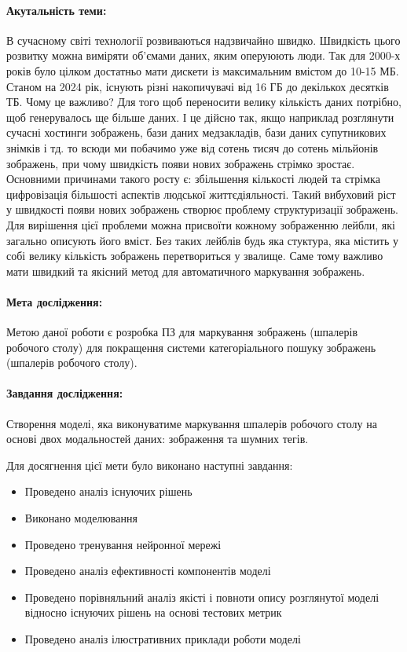 \documentclass{udstu}
\begin{document}
\paragraph{\textbf{Акутальність теми:}}
В сучасному світі технології розвиваються надзвичайно швидко. Швидкість цього розвитку можна виміряти
об'ємами даних, яким оперуюють люди. Так для 2000-х років було цілком достатньо мати дискети із максимальним вмістом
до 10-15 МБ. Станом на 2024 рік, існують різні накопичувачі від 16 ГБ до декількох десятків ТБ. Чому це важливо?
Для того щоб переносити велику кількість даних потрібно, щоб генерувалось ще більше даних. І це дійсно так, якщо
наприклад розглянути сучасні хостинги зображень, бази даних медзакладів, бази даних супутникових знімків і тд.
то всюди ми побачимо уже від сотень тисяч до сотень мільйонів зображень,
при чому швидкість появи нових зображень стрімко зростає. Основними причинами такого росту є: збільшення кількості людей
та стрімка цифровізація більшості аспектів людської життєдіяльності. Такий вибуховий ріст у швидкості
появи нових зображень створює проблему структуризації зображень. Для вирішення цієї проблеми можна присвоїти
кожному зображенню лейбли, які загально описують його вміст.
Без таких лейблів будь яка стуктура, яка містить у собі велику кількість зображень перетвориться
у звалище. Саме тому важливо мати швидкий та якісний метод для автоматичного маркування зображень.

\paragraph{\textbf{Мета дослідження:}}
Метою даної роботи є розробка ПЗ для маркування зображень (шпалерів робочого столу)
для покращення системи категоріального пошуку зображень (шпалерів робочого столу).

\paragraph{\textbf{Завдання дослідження:}}
Створення моделі, яка виконуватиме маркування шпалерів робочого столу на основі двох модальностей даних:
зображення та шумних тегів.

Для досягнення цієї мети було виконано наступні завдання:

\begin{itemize}
	\item Проведено аналіз існуючих рішень
	\item Виконано моделювання
	\item Проведено тренування нейронної мережі
	\item Проведено аналіз ефективності компонентів моделі
	\item Проведено порівняльний аналіз якісті і повноти опису розглянутої моделі
	відносно існуючих рішень на основі тестових метрик
	\item Проведено аналіз ілюстративних приклади роботи моделі
\end{itemize}
\end{document}
